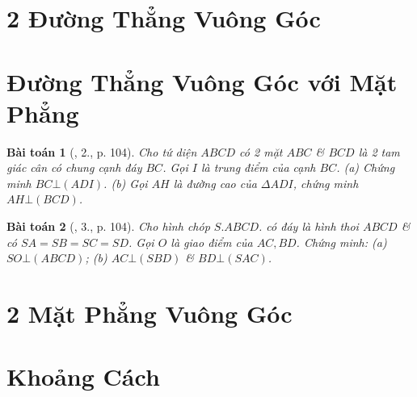 \documentclass{article}
\numberwithin{equation}{section}
\newtheorem{baitoan}{Bài toán}
\begin{document}

\section{2 Đường Thẳng Vuông Góc}


\section{Đường Thẳng Vuông Góc với Mặt Phẳng}

\begin{baitoan}[\cite{SGK_Toan_11_hinh_hoc_co_ban}, 2., p. 104]
	Cho tứ diện $ABCD$ có 2 mặt $ABC$ \& $BCD$ là 2 tam giác cân có chung cạnh đáy $BC$. Gọi $I$ là trung điểm của cạnh $BC$. (a) Chứng minh $BC\bot(ADI)$. (b) Gọi $AH$ là đường cao của $\Delta ADI$, chứng minh $AH\bot(BCD)$.
\end{baitoan}

\begin{baitoan}[\cite{SGK_Toan_11_hinh_hoc_co_ban}, 3., p. 104]
	Cho hình chóp $S.ABCD$. có đáy là hình thoi $ABCD$ \& có $SA = SB = SC = SD$. Gọi $O$ là giao điểm của $AC,BD$. Chứng minh: (a) $SO\bot(ABCD)$; (b) $AC\bot(SBD)$ \& $BD\bot(SAC)$.
\end{baitoan}


\section{2 Mặt Phẳng Vuông Góc}


\section{Khoảng Cách}


\printbibliography[heading=bibintoc]
	
\end{document}

